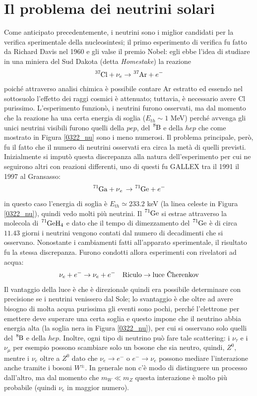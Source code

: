 \section{Il problema dei neutrini solari}\label{0322-sec-nu}
Come anticipato precedentemente, i neutrini sono i miglior candidati per la verifica sperimentale della nucleosintesi; il primo esperimento di verifica fu fatto da Richard Davis nel 1960 e gli valse il premio Nobel: egli ebbe l'idea di studiare in una miniera del Sud Dakota (detta \textit{Homestake}) la reazione
$$\ce{^{37}Cl} + \nu_e \to \ce{^{37}Ar} + e^-$$
poiché attraverso analisi chimica è possibile contare Ar estratto ed essendo nel sottosuolo l'effetto dei raggi cosmici è attenuato; tuttavia, è necessario avere Cl purissimo. L'esperimento funzionò, i neutrini furono osservati, ma dal momento che la reazione ha una certa energia di soglia ($E_{th}\sim 1$ MeV) perché avvenga gli unici neutrini visibili furono quelli della $pep$, del $\ce{^8B}$ e della $hep$ che come mostrato in Figura \ref{0322_nu} sono i meno numerosi. Il problema principale, però, fu il fatto che il numero di neutrini osservati era circa la metà di quelli previsti.\\
Inizialmente si imputò questa discrepanza alla natura dell'esperimento per cui ne seguirono altri con reazioni differenti, uno di questi fu GALLEX tra il 1991  il 1997 al Gransasso:
$$\ce{^{71}Ga + \nu_e \to \ce{^{71}Ge}} +e^-$$
in questo caso l'energia di soglia è $E_{th}\simeq 233.2$ keV (la linea celeste in Figura \ref{0322_nu}), quindi vedo molti più neutrini. Il $\ce{^{71}Ge}$ si estrae attraverso la molecola di $\ce{^{71}GeH_4}$ e dato che il tempo di dimezzamento del $\ce{^{71}Ge}$ è di circa $11.43$ giorni i neutrini vengono contati dal numero di decadimenti che si osservano. Nonostante i cambiamenti fatti all'apparato sperimentale, il risultato fu la stessa discrepanza. Furono condotti allora esperimenti con rivelatori \cherenkov{} ad acqua:
$$\nu_e + e^- \to \nu_e + e^- \quad \text{Riculo} \to \text{luce \cherenkov}$$
Il vantaggio della luce \cherenkov è che è direzionale quindi era possibile determinare con precisione se i neutrini venissero dal Sole; lo svantaggio è che oltre ad avere bisogno di molta acqua purissima gli eventi sono pochi, perché l'elettrone per emettere deve superare una certa soglia e questo impone che il neutrino abbia energia alta (la soglia nera in Figura \ref{0322_nu}), per cui si osservano solo quelli del $\ce{^8B}$ e della $hep$. Inoltre, ogni tipo di neutrino può fare tale scattering: i $\nu_\tau$ e i $\nu_\mu$ per esempio possono scambiare solo un bosone che sia neutro, quindi, $Z^0$, mentre i $\nu_e$ oltre a $Z^0$ dato che $\nu_e\to e^-$ o $e^-\to \nu_e$ possono mediare l'interazione anche tramite i bosoni $W^\pm$. In generale non c'è modo di distinguere un processo dall'altro, ma dal momento che $m_W\ll m_Z$ questa interazione è molto più probabile (quindi $\nu_e$ in maggior numero).
